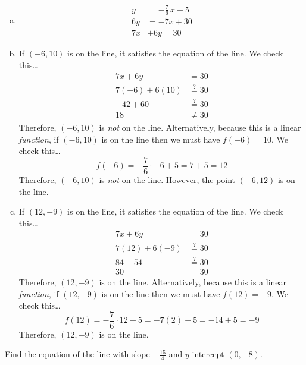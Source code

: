\documentclass[11pt,letterpaper]{article}
\begin{document}
\sol
\begin{enumerate}[(a)]
\item 
	\[
	\begin{aligned}
	y&= -\frac{7}{6}\,x + 5 \\[0.3cm]
	6y&= -7x + 30 \\[0.3cm]
	7x &+ 6y= 30 
	\end{aligned}
	\] \pspace

\item If $(-6, 10)$ is on the line, it satisfies the equation of the line. We check this\dots
	\[
	\begin{aligned}
	7x + 6y&= 30 \\[0.3cm]
	7(-6) + 6(10)&\stackrel{?}{=} 30 \\[0.3cm]
	-42 + 60&\stackrel{?}{=} 30 \\[0.3cm]
	18&\neq 30 
	\end{aligned}
	\]
Therefore, $(-6, 10)$ is \textit{not} on the line. Alternatively, because this is a linear \textit{function}, if $(-6, 10)$ is on the line then we must have $f(-6)= 10$. We check this\dots
	\[
	f(-6)= -\frac{7}{6} \cdot -6 + 5= 7 + 5= 12
	\]
Therefore, $(-6, 10)$ is \textit{not} on the line. However, the point $(-6, 12)$ is on the line. \pspace

\item If $(12, -9)$ is on the line, it satisfies the equation of the line. We check this\dots
	\[
	\begin{aligned}
	7x + 6y&= 30 \\[0.3cm]
	7(12) + 6(-9)&\stackrel{?}{=} 30 \\[0.3cm]
	84 - 54&\stackrel{?}{=} 30 \\[0.3cm]
	30&= 30 
	\end{aligned}
	\]
Therefore, $(12, -9)$ is on the line. Alternatively, because this is a linear \textit{function}, if $(12, -9)$ is on the line then we must have $f(12)= -9$. We check this\dots
	\[
	f(12)= -\frac{7}{6} \cdot 12 + 5= -7(2) + 5= -14 + 5= -9
	\]
Therefore, $(12, -9)$ is on the line. 
\end{enumerate}



\newpage



 Find the equation of the line with slope $-\frac{15}{4}$ and $y$-intercept $(0, -8)$. \pspace
\end{document}
